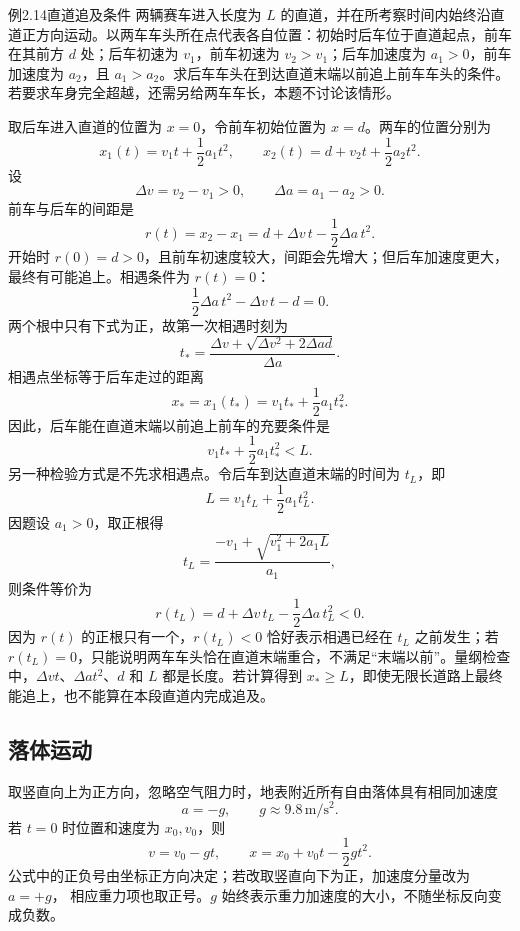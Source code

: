 \begin{origexamplebox}{例2.14\quad 直道追及条件}
两辆赛车进入长度为 $L$ 的直道，并在所考察时间内始终沿直道正方向运动。以两车车头所在点代表各自位置：初始时后车位于直道起点，前车在其前方 $d$ 处；后车初速为 $v_1$，前车初速为 $v_2>v_1$；后车加速度为 $a_1>0$，前车加速度为 $a_2$，且 $a_1>a_2$。求后车车头在到达直道末端以前追上前车车头的条件。若要求车身完全超越，还需另给两车车长，本题不讨论该情形。
\end{origexamplebox}
\begin{xesolution}
取后车进入直道的位置为 $x=0$，令前车初始位置为 $x=d$。两车的位置分别为
\[
x_1(t)=v_1t+\frac12a_1t^2,
\qquad
x_2(t)=d+v_2t+\frac12a_2t^2.
\]
设
\[
\Delta v=v_2-v_1>0,
\qquad
\Delta a=a_1-a_2>0.
\]
前车与后车的间距是
\[
 r(t)=x_2-x_1=d+\Delta v\,t-\frac12\Delta a\,t^2.
\]
开始时 $r(0)=d>0$，且前车初速度较大，间距会先增大；但后车加速度更大，最终有可能追上。相遇条件为 $r(t)=0$：
\[
\frac12\Delta a\,t^2-\Delta v\,t-d=0.
\]
两个根中只有下式为正，故第一次相遇时刻为
\[
 t_*=\frac{\Delta v+\sqrt{\Delta v^2+2\Delta a d}}{\Delta a}.
\]
相遇点坐标等于后车走过的距离
\[
x_*=x_1(t_*)=v_1t_*+\frac12a_1t_*^2.
\]
因此，后车能在直道末端以前追上前车的充要条件是
\[
  \boxed{v_1t_*+\frac12a_1t_*^2<L}.
\]
另一种检验方式是不先求相遇点。令后车到达直道末端的时间为 $t_L$，即
\[
L=v_1t_L+\frac12a_1t_L^2.
\]
因题设 $a_1>0$，取正根得
\[
t_L=\frac{-v_1+\sqrt{v_1^2+2a_1L}}{a_1},
\]
则条件等价为
\[
\boxed{r(t_L)=d+\Delta v\,t_L-\frac12\Delta a\,t_L^2<0}.
\]
因为 $r(t)$ 的正根只有一个，$r(t_L)<0$ 恰好表示相遇已经在 $t_L$ 之前发生；若 $r(t_L)=0$，只能说明两车车头恰在直道末端重合，不满足“末端以前”。量纲检查中，$\Delta vt$、$\Delta at^2$、$d$ 和 $L$ 都是长度。若计算得到 $x_*\ge L$，即使无限长道路上最终能追上，也不能算在本段直道内完成追及。
\end{xesolution}

\subsection{落体运动}

取竖直向上为正方向，忽略空气阻力时，地表附近所有自由落体具有相同加速度
\begin{equation}
  a=-g,\qquad g\approx9.8\,\mathrm{m/s^2}.
\end{equation}
若 $t=0$ 时位置和速度为 $x_0,v_0$，则
\begin{equation}
  v=v_0-gt,\qquad x=x_0+v_0t-\frac12gt^2.
\end{equation}
公式中的正负号由坐标正方向决定；若改取竖直向下为正，加速度分量改为 $a=+g$，
相应重力项也取正号。$g$ 始终表示重力加速度的大小，不随坐标反向变成负数。

